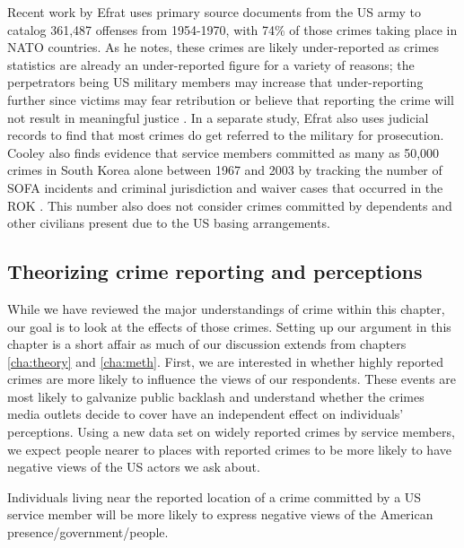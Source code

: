 Recent work by Efrat uses primary source documents from the US army to catalog 361,487 offenses from 1954-1970, with 74\% of those crimes taking place in NATO countries.\cite{efrat2021a} As he notes, these crimes are likely under-reported as crimes statistics are already an under-reported figure for a variety of reasons; the perpetrators being US military members may increase that under-reporting further since victims may fear retribution or believe that reporting the crime will not result in meaningful justice \cite{allenandflynn2013}. In a separate study, Efrat also uses judicial records to find that most crimes do get referred to the military for prosecution.\cite{efrat2021b} Cooley also finds evidence that service members committed as many as 50,000 crimes in South Korea alone between 1967 and 2003 by tracking the number of SOFA incidents and criminal jurisdiction and waiver cases that occurred in the ROK \cite{Cooley2008}. This number also does not consider crimes committed by dependents and other civilians present due to the US basing arrangements. 





\subsection*{Theorizing crime reporting and perceptions}

While we have reviewed the major understandings of crime within this chapter, our goal is to look at the effects of those crimes. Setting up our argument in this chapter is a short affair as much of our discussion extends from chapters \ref{cha:theory} and \ref{cha:meth}. First, we are interested in whether highly reported crimes are more likely to influence the views of our respondents. These events are most likely to galvanize public backlash and understand whether the crimes media outlets decide to cover have an independent effect on individuals' perceptions. Using a new data set on widely reported crimes by service members, we expect people nearer to places with reported crimes to be more likely to have negative views of the US actors we ask about.

\begin{hyp}
	Individuals living near the reported location of a crime committed by a US service member will be more likely to express negative views of the American presence/government/people.  %
\end{hyp}

